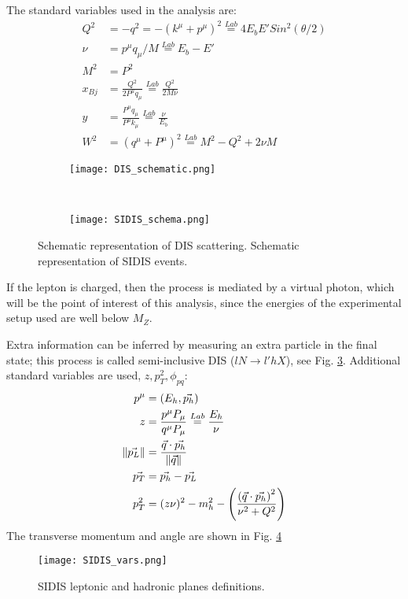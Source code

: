 The standard variables used in the analysis are: 
\begin{align}
Q^2 &= -q^2 = -(k^\mu+p^\mu)^2 \overset{Lab}{=} 4E_bE'Sin^2(\theta/2)\\
\nu&=p^\mu q_\mu /M \overset{Lab}{=}E_b-E'\\
M^2 &= P^2\\
x_{Bj}&=\frac{Q^2}{2P^\mu q_\mu}\overset{Lab}{=}\frac{Q^2}{2M\nu}\\
y&=\frac{P^\mu q_\mu}{P^\mu k_\mu}\overset{Lab}{=}\frac{\nu}{E_b}\\
W^2&=(q^\mu + P^\mu)^2 \overset{Lab}{=} M^2- Q^2 + 2\nu M
\label{eq:DIS}
\end{align}
%
\begin{figure}[!ht]
\centering
\begin{subfigure}[b]{0.45\textwidth}
\texttt{[image: DIS\_schematic.png]}
\caption{}
\label{fig:DIS}
\end{subfigure}
~
\begin{subfigure}[b]{0.45\textwidth}
\texttt{[image: SIDIS\_schema.png]}
\caption{}
\label{fig:SIDIS}
\end{subfigure}
\caption{\protect{} Schematic representation of DIS scattering. \protect{} Schematic representation of SIDIS events.}
\end{figure}
%
If the lepton is charged, then the process is mediated by a virtual photon, which will be the point of interest of this analysis, since the energies of the experimental setup used are well below $M_Z$.

Extra information can be inferred by measuring an extra particle in the final state; this process is called semi-inclusive DIS ($lN \rightarrow l'hX$), see Fig. \ref{fig:SIDIS}. Additional standard variables are used, $z,p_T^2,\phi_{pq}$:
%
\begin{align}
p^\mu&=(E_h,\vec{p_h})\\
z&=\frac{p^\mu P_\mu}{q^\mu P_\mu} \overset{Lab}{=} \frac{E_h}{\nu}\\
\left\|\vec{p_L}\right\|&= \frac{\vec{q}\cdot\vec{p_h}}{ \left\|\vec{q}\right\|}\notag \\
\vec{p_T}&=\vec{p_h} - \vec{p_L}\notag \\
p_T^2 &= (z\nu)^2 - m_h^2- \left( \frac{\left(\vec{q}\cdot\vec{p_h}\right)^2}{\nu^2 + Q^2}\right)
\label{eq:SIDIS}
\end{align}
The transverse momentum and angle are shown in Fig. \ref{fig:SIDIS_plane}
%
\begin{figure}[!ht]
\centering
\texttt{[image: SIDIS\_vars.png]}
\caption{SIDIS  leptonic and hadronic planes definitions.}
\label{fig:SIDIS_plane}
\end{figure}
%
